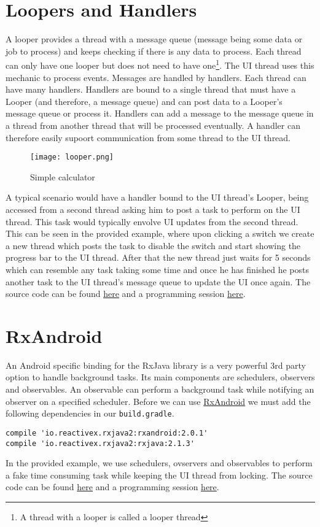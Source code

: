 \section{Loopers and Handlers}
A looper provides a thread with a message queue (message being some data or job to process) and keeps checking if there is any data to process. Each thread can only have one looper but does not need to have one\footnote{A thread with a looper is called a looper thread}. The UI thread uses this mechanic to process events. Messages are handled by handlers. Each thread can have many handlers. Handlers are bound to a single thread that must have a Looper (and therefore, a message queue) and can post data to a Looper's message queue or process it. Handlers can add a message to the message queue in a thread from another thread that will be processed eventually. A handler can therefore easily supoort communication from some thread to the UI thread.

\begin{figure}[H]
\centering
\texttt{[image: looper.png]}
\caption{Simple calculator}
\label{fig:simcal}
\end{figure}

A typical scenario would have a handler bound to the UI thread's Looper, being accessed from a second thread asking him to post a task to perform on the UI thread. This task would typically envolve UI updates from the second thread. This can be seen in the provided example, where upon clicking a switch we create a new thread which posts the task to disable the switch and start showing the progress bar to the UI thread. After that the new thread just waits for 5 seconds which can resemble any task taking some time and once he has finished he posts another task to the UI thread's message queue to update the UI once again. The source code can be found \href{https://github.com/JonSteinn/AndroidDevelopment/tree/master/examples/lab2/handlers}{here} and a programming session \href{TODO}{here}.

\section{RxAndroid}
An Android specific binding for the RxJava library is a very powerful 3rd party option to handle background tasks. Its main components are schedulers, observers and observables. An observable can perform a background task while notifying an observer on a specified scheduler. Before we can use \href{https://github.com/ReactiveX/RxAndroid}{RxAndroid} we must add the following dependencies in our \texttt{build.gradle}.
\begin{lstlisting}[style=A_txt]
compile 'io.reactivex.rxjava2:rxandroid:2.0.1'
compile 'io.reactivex.rxjava2:rxjava:2.1.3'
\end{lstlisting}
In the provided example, we use schedulers, ovservers and observables to perform a fake time consuming task while keeping the UI thread from locking. The source code can be found \href{https://github.com/JonSteinn/AndroidDevelopment/tree/master/examples/lab2/rxandroid}{here} and a programming session \href{TODO}{here}.

